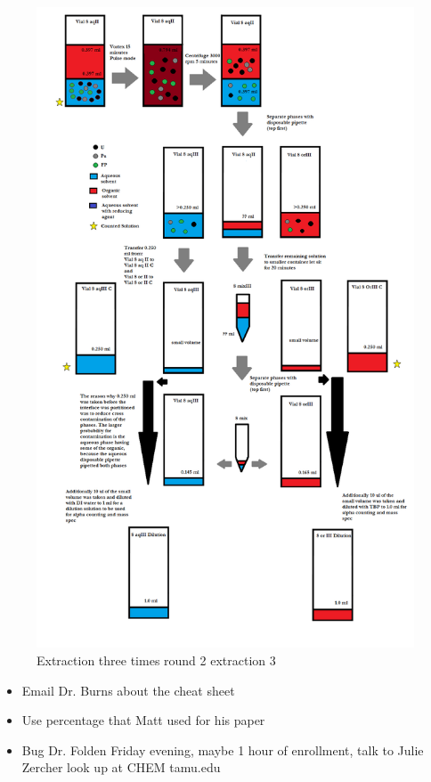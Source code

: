\documentclass[idxtotoc,hyperref,openany,oneside]{labbook} %
\begin{document}
\begin{figure}[H] %
\begin{center}
  \includegraphics[width=0.8\linewidth]
                  {Figures/Cycle_x3_round_2_extraction_3}
\end{center}
\caption{Extraction three times round 2 extraction 3}
\label{fig:round2_extraction3}
\end{figure}



\begin{itemize}
\item{Email Dr. Burns about the cheat sheet}
\item{Use percentage that Matt used for his paper}
\item{Bug Dr. Folden Friday evening, maybe 1 hour of
enrollment, talk to Julie Zercher look up at CHEM tamu.edu}
\end{itemize}
\end{document}
